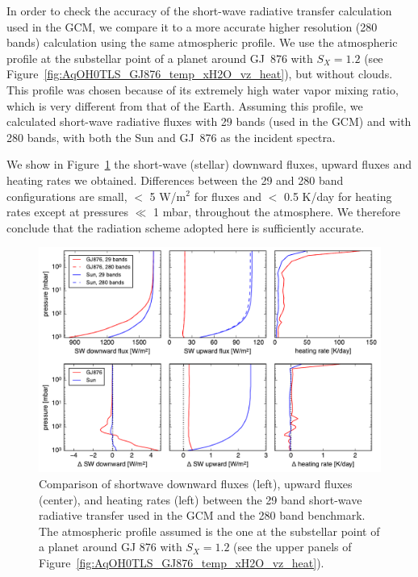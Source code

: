 \documentclass[11pt,numberedappendix,twocolappendix,]{emulateapj}
\def\wv{water vapor}
\begin{document}
In order to check the accuracy of the short-wave radiative transfer calculation used in the GCM, we compare it to a more accurate higher resolution (280 bands) calculation using the same atmospheric profile. 
We use the atmospheric profile at the substellar point of a planet around GJ~876 with $S_X=1.2$ (see Figure~\ref{fig:AqOH0TLS_GJ876_temp_xH2O_vz_heat}), but without clouds. 
This profile was chosen because of its extremely high \wv{} mixing ratio, which is very different from that of the Earth. 
Assuming this profile, we calculated short-wave radiative fluxes with 29 bands (used in the GCM) and with 280 bands, with both the Sun and GJ~876 as the incident spectra.

We show in Figure~\ref{fig:socrates} the short-wave (stellar) downward fluxes, upward fluxes and heating rates we obtained.
Differences between the 29 and 280 band configurations are small, $<$ 5 W/m$^2$ for fluxes and $<$ 0.5 K/day for heating rates except at pressures $\ll$ 1 mbar, throughout the atmosphere. We therefore conclude that the radiation scheme adopted here is sufficiently accurate.

\begin{figure}[!htb]
    \begin{center}
    \includegraphics[width=0.8\hsize]{rad_comparison_SW29-SW280_AqOH0TLS_GJ876S12P20L40Q.pdf}
    \end{center}
\caption{Comparison of shortwave downward fluxes (left), upward fluxes (center), and heating rates (left) between the 29 band short-wave radiative transfer used in the GCM and the 280 band benchmark. The atmospheric profile assumed is the one at the substellar point of a planet around GJ 876 with $S_X=1.2$ (see the upper panels of Figure~\ref{fig:AqOH0TLS_GJ876_temp_xH2O_vz_heat}). }
\label{fig:socrates}
\end{figure}
\end{document}
